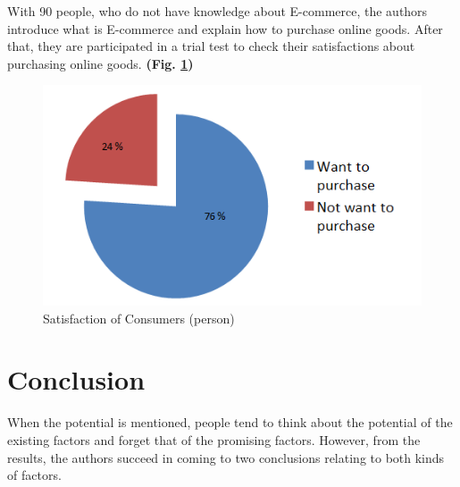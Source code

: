 \documentclass[conference]{IEEEtran}
\begin{document}
With 90 people, who do not have knowledge about E-commerce, the authors introduce what is E-commerce and explain how to purchase online goods. After that, they are participated in a trial test to check their satisfactions about purchasing online goods. \textbf{(Fig. \ref{fig:satisfaction})}

\begin{figure}[h]
\centering
\includegraphics[width=0.7\linewidth]{./satisfaction}
\caption{Satisfaction of Consumers (person)}
\label{fig:satisfaction}
\end{figure}









\section{Conclusion} \label{conclusion}
When the potential is mentioned, people tend to think about the potential of the existing factors and forget that of the promising factors. However, from the results, the authors succeed in coming to two conclusions relating to both kinds of factors.
\end{document}
